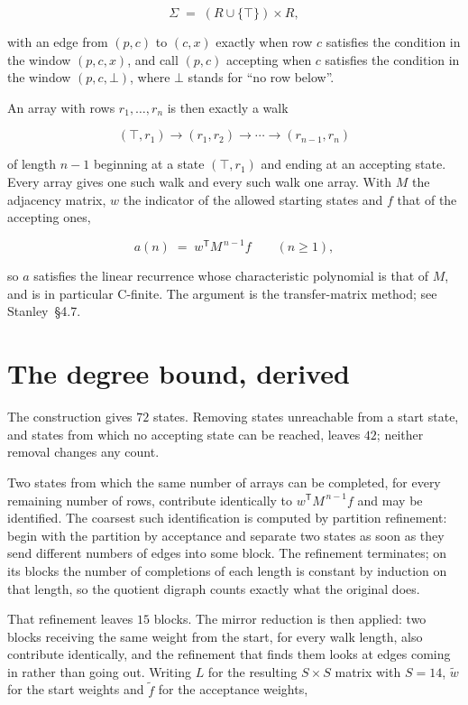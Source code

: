 \documentclass[11pt]{article}
\theoremstyle{definition}
\begin{document}
\[\Sigma \;=\; (R \cup \{\top\}) \times R,\]

with an edge from $(p,c)$ to $(c,x)$ exactly when row $c$ satisfies the condition in the window $(p,c,x)$, and call $(p,c)$ accepting when $c$ satisfies the condition in the window $(p,c,\bot)$, where $\bot$ stands for ``no row below''.

An array with rows $r_1,\dots,r_n$ is then exactly a walk

\[(\top,r_1) \to (r_1,r_2) \to \cdots \to (r_{n-1},r_n)\]

of length $n-1$ beginning at a state $(\top,r_1)$ and ending at an accepting state. Every array gives one such walk and every such walk one array. With $M$ the adjacency matrix, $w$ the indicator of the allowed starting states and $f$ that of the accepting ones,

\[a(n) \;=\; w^{\mathsf T} M^{\,n-1} f \qquad (n \ge 1),\]

so $a$ satisfies the linear recurrence whose characteristic polynomial is that of $M$, and is in particular C-finite. The argument is the transfer-matrix method; see Stanley~\S4.7.

\section{The degree bound, derived}

The construction gives $72$ states. Removing states unreachable from a start state, and states from which no accepting state can be reached, leaves $42$; neither removal changes any count.

Two states from which the same number of arrays can be completed, for every remaining number of rows, contribute identically to $w^{\mathsf T}M^{\,n-1}f$ and may be identified. The coarsest such identification is computed by partition refinement: begin with the partition by acceptance and separate two states as soon as they send different numbers of edges into some block. The refinement terminates; on its blocks the number of completions of each length is constant by induction on that length, so the quotient digraph counts exactly what the original does.

That refinement leaves $15$ blocks. The mirror reduction is then applied: two blocks receiving the same weight from the start, for every walk length, also contribute identically, and the refinement that finds them looks at edges coming in rather than going out. Writing $L$ for the resulting $S \times S$ matrix with $S = 14$, $\tilde w$ for the start weights and $\tilde f$ for the acceptance weights,
\end{document}
